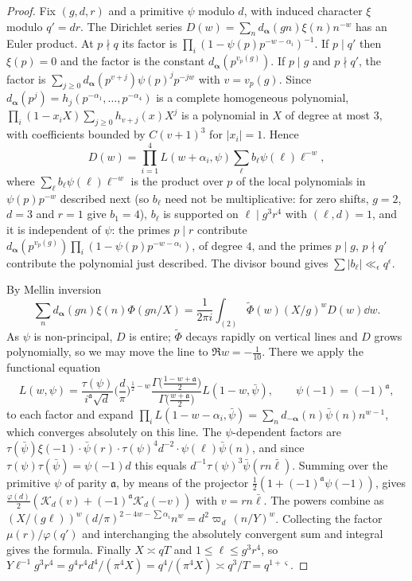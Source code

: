 \documentclass[11pt,colorlinks]{charlie}
\begin{document}
\begin{proof}
Fix $(g,d,r)$ and a primitive $\psi$ modulo $d$, with induced character $\xi$ modulo $q'=dr$. The Dirichlet series $D(w)=\sum_nd_{\boldsymbol\alpha}(gn)\xi(n)n^{-w}$ has an Euler product. At $p\nmid q$ its factor is $\prod_i(1-\psi(p)p^{-w-\alpha_i})^{-1}$. If $p\mid q'$ then $\xi(p)=0$ and the factor is the constant $d_{\boldsymbol\alpha}(p^{v_p(g)})$. If $p\mid g$ and $p\nmid q'$, the factor is $\sum_{j\ge0}d_{\boldsymbol\alpha}(p^{v+j})\psi(p)^jp^{-jw}$ with $v=v_p(g)$. Since $d_{\boldsymbol\alpha}(p^j)=h_j(p^{-\alpha_1},\dots,p^{-\alpha_4})$ is a complete homogeneous polynomial, $\prod_i(1-x_iX)\sum_{j\ge0}h_{v+j}(x)X^j$ is a polynomial in $X$ of degree at most $3$, with coefficients bounded by $C(v+1)^3$ for $|x_i|=1$. Hence
\[
 D(w)=\prod_{i=1}^4L(w+\alpha_i,\psi)\sum_\ell b_\ell\psi(\ell)\ell^{-w},
\]
where $\sum_\ell b_\ell\psi(\ell)\ell^{-w}$ is the product over $p$ of the local polynomials in $\psi(p)p^{-w}$ described next (so $b_\ell$ need not be multiplicative: for zero shifts, $g=2$, $d=3$ and $r=1$ give $b_1=4$), $b_\ell$ is supported on $\ell\mid g^3r^4$ with $(\ell,d)=1$, and it is independent of $\psi$: the primes $p\mid r$ contribute $d_{\boldsymbol\alpha}(p^{v_p(g)})\prod_i(1-\psi(p)p^{-w-\alpha_i})$, of degree $4$, and the primes $p\mid g$, $p\nmid q'$ contribute the polynomial just described. The divisor bound gives $\sum|b_\ell|\ll_\epsilon q^\epsilon$.

By Mellin inversion
\[
 \sum_nd_{\boldsymbol\alpha}(gn)\xi(n)\Phi(gn/X)=\frac1{2\pi i}\int_{(2)}\widetilde\Phi(w)(X/g)^wD(w)\dd w .
\]
As $\psi$ is non-principal, $D$ is entire; $\widetilde\Phi$ decays rapidly on vertical lines and $D$ grows polynomially, so we may move the line to $\Re w=-\frac1{10}$. There we apply the functional equation \cite[Theorem~4.15]{IK}
\[
 L(w,\psi)=\frac{\tau(\psi)}{i^{\mathfrak a}\sqrt d}\Big(\frac d\pi\Big)^{\frac12-w}\frac{\Gamma\big(\frac{1-w+\mathfrak a}2\big)}{\Gamma\big(\frac{w+\mathfrak a}2\big)}L(1-w,\bar\psi),\qquad\psi(-1)=(-1)^{\mathfrak a},
\]
to each factor and expand $\prod_iL(1-w-\alpha_i,\bar\psi)=\sum_nd_{-\boldsymbol\alpha}(n)\bar\psi(n)n^{w-1}$, which converges absolutely on this line. The $\psi$-dependent factors are $\tau(\bar\psi)\xi(-1)\cdot\bar\psi(r)\cdot\tau(\psi)^4d^{-2}\cdot\psi(\ell)\bar\psi(n)$, and since $\tau(\psi)\tau(\bar\psi)=\psi(-1)d$ this equals $d^{-1}\tau(\psi)^3\bar\psi(rn\bar\ell)$. Summing over the primitive $\psi$ of parity $\mathfrak a$, by means of the projector $\frac12(1+(-1)^{\mathfrak a}\psi(-1))$, gives $\frac{\varphi(d)}2(\mathscr K_d(v)+(-1)^{\mathfrak a}\mathscr K_d(-v))$ with $v=rn\bar\ell$. The powers combine as $(X/(g\ell))^w(d/\pi)^{2-4w-\sum\alpha_i}n^{w}=d^2\varpi_d\,(n/Y)^w$. Collecting the factor $\mu(r)/\varphi(q')$ and interchanging the absolutely convergent sum and integral gives the formula. Finally $X\asymp qT$ and $1\le\ell\le g^3r^4$, so $Y\ell^{-1}g^3r^4=g^4r^4d^4/(\pi^4X)=q^4/(\pi^4X)\asymp q^3/T=q^{1+\varsigma}$.
\end{proof}
\end{document}

